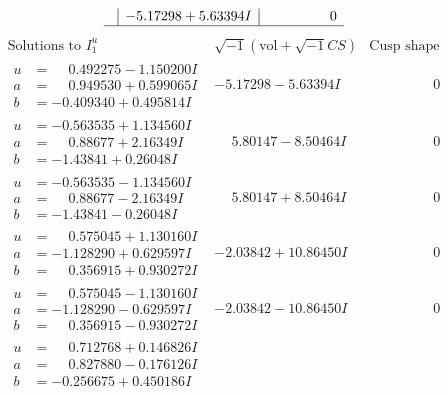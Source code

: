 \documentclass[1p]{elsarticle_modified}
\theoremstyle{definition}
\newcommand{\I}{\sqrt{-1}}
\begin{document}
$$\begin{array}{c|c|c}
 & -5.17298 + 5.63394 I & \phantom{-0.000000 } 0\\
 \hline 
 \end{array}$$\newpage$$\begin{array}{c|c|c}  
\text{Solutions to }I^u_{1}& \I (\text{vol} + \sqrt{-1}CS) & \text{Cusp shape}\\
 \hline 
\begin{aligned}
u &= \phantom{-}0.492275 - 1.150200 I \\
a &= \phantom{-}0.949530 + 0.599065 I \\
b &= -0.409340 + 0.495814 I\end{aligned}
 & -5.17298 - 5.63394 I & \phantom{-0.000000 } 0 \\ \hline\begin{aligned}
u &= -0.563535 + 1.134560 I \\
a &= \phantom{-}0.88677 + 2.16349 I \\
b &= -1.43841 + 0.26048 I\end{aligned}
 & \phantom{-}5.80147 - 8.50464 I & \phantom{-0.000000 } 0 \\ \hline\begin{aligned}
u &= -0.563535 - 1.134560 I \\
a &= \phantom{-}0.88677 - 2.16349 I \\
b &= -1.43841 - 0.26048 I\end{aligned}
 & \phantom{-}5.80147 + 8.50464 I & \phantom{-0.000000 } 0 \\ \hline\begin{aligned}
u &= \phantom{-}0.575045 + 1.130160 I \\
a &= -1.128290 + 0.629597 I \\
b &= \phantom{-}0.356915 + 0.930272 I\end{aligned}
 & -2.03842 + 10.86450 I & \phantom{-0.000000 } 0 \\ \hline\begin{aligned}
u &= \phantom{-}0.575045 - 1.130160 I \\
a &= -1.128290 - 0.629597 I \\
b &= \phantom{-}0.356915 - 0.930272 I\end{aligned}
 & -2.03842 - 10.86450 I & \phantom{-0.000000 } 0 \\ \hline\begin{aligned}
u &= \phantom{-}0.712768 + 0.146826 I \\
a &= \phantom{-}0.827880 - 0.176126 I \\
b &= -0.256675 + 0.450186 I\end{aligned}

\end{array}$$
\end{document}
